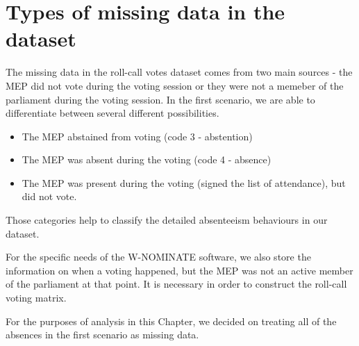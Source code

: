 \documentclass[a4paper,12pt]{report}
\begin{document}
        \section{Types of missing data in the dataset}\label{sec:types-of-missing-data-in-the-dataset}
            The missing data in the roll-call votes dataset comes from two main sources - the MEP did not vote
            during the voting session or they were not a memeber of the parliament during the voting session.
            In the first scenario, we are able to differentiate between several different possibilities.
            \begin{itemize}
                \item The MEP abstained from voting (code 3 - abstention)
                \item The MEP was absent during the voting (code 4 - absence)
                \item The MEP was present during the voting (signed the list of attendance), but did not vote.
            \end{itemize}
            Those categories help to classify the detailed absenteeism behaviours in our dataset.

            For the specific needs of the W-NOMINATE software, we also store the information on when a voting
            happened, but the MEP was not an active member of the parliament at that point. It is necessary in
            order to construct the roll-call voting matrix.

            For the purposes of analysis in this Chapter, we decided on treating all of the absences in the
            first scenario as missing data.
\end{document}
